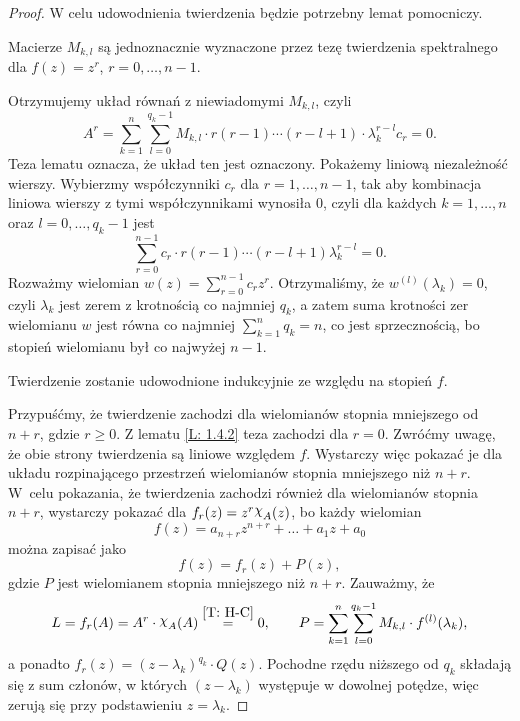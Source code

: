 \begin{proof}
  W celu udowodnienia twierdzenia będzie potrzebny lemat pomocniczy.
%
  \begin{nestedlemma} \label{L: 1.4.2}
    Macierze $M_{k,l}$ są jednoznacznie wyznaczone przez tezę twierdzenia spektralnego dla
    $f(z) = z^r$, $r = 0, \ldots, n-1$.
  \end{nestedlemma}
%
  \begin{nestedproof}
    Otrzymujemy układ równań z niewiadomymi $M_{k,l}$, czyli
%   
    \begin{equation*}
      A^r = \sum_{k=1}^n \sum_{l=0}^{q_k-1} M_{k,l} \cdot r (r-1) \cdots (r-l+1) \cdot \lambda_k^{r-l} c_r = 0.
    \end{equation*}
%   
    Teza lematu oznacza, że układ ten jest oznaczony. Pokażemy liniową niezależność wierszy. Wybierzmy współczynniki 
    $c_r$ dla $r = 1, \ldots, n-1$, tak aby kombinacja liniowa wierszy z tymi współczynnikami wynosiła $0$, czyli dla
    każdych $k = 1,\ldots,n$ oraz $l = 0, \ldots, q_k-1$ jest
%   
    \begin{equation*}
      \sum_{r=0}^{n-1} c_r \cdot r (r-1) \cdots (r-l+1) \lambda_k^{r-l} = 0.
    \end{equation*}
%
    Rozważmy wielomian $w(z) = \sum_{r=0}^{n-1} c_r z^r$. Otrzymaliśmy, że $w^{(l)}(\lambda_k) = 0$, czyli 
    $\lambda_k$ jest zerem z krotnością co najmniej $q_k$, a zatem suma krotności zer wielomianu $w$ jest równa co 
    najmniej $\sum_{k=1}^n q_k = n$, co jest sprzecznością, bo stopień wielomianu był co najwyżej $n-1$.
  \end{nestedproof}
%
  Twierdzenie zostanie udowodnione indukcyjnie ze względu na stopień $f$.
  
  Przypuśćmy, że twierdzenie zachodzi dla wielomianów stopnia mniejszego od $n+r$, gdzie $r \geq 0$. Z lematu 
  \ref{L: 1.4.2} teza zachodzi dla $r=0$. Zwróćmy uwagę, że obie strony twierdzenia są liniowe względem $f$. 
  Wystarczy więc pokazać je dla układu rozpinającego przestrzeń wielomianów stopnia mniejszego niż $n+r$. W~celu 
  pokazania, że twierdzenia zachodzi również dla wielomianów stopnia $n+r$, wystarczy pokazać dla $f_r(z) = z^r 
  \mychi_A(z)$, bo każdy wielomian
%
  \begin{equation*}
    f(z) = a_{n+r} z^{n+r} + \ldots + a_1 z + a_0
  \end{equation*}
%
  można zapisać jako
%
  \begin{equation*}
    f(z) = f_r(z) + P(z),
  \end{equation*}
%
  gdzie $P$ jest wielomianem stopnia mniejszego niż $n+r$. Zauważmy, że
%
  \begin{equation*}
    L = f_r(A) = A^r \cdot \mychi_A(A) \overset{\ref{T: H-C}}{=} 0, \qquad 
    P = \sum_{k=1}^n \sum_{l=0}^{q_k-1} M_{k,l} \cdot f^{(l)}(\lambda_k),
  \end{equation*}
%
  a ponadto $f_r(z) = (z-\lambda_k)^{q_k} \cdot Q(z)$. Pochodne rzędu niższego od $q_k$ składają się z sum członów, w 
  których $(z-\lambda_k)$ występuje w dowolnej potędze, więc zerują się przy podstawieniu $z=\lambda_k$.
%
\end{proof}
